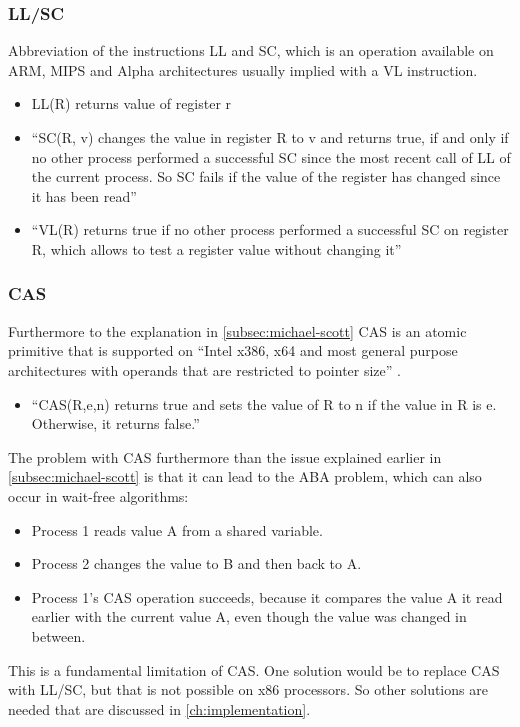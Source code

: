 \subsubsection{\acf{LL/SC}}\label{subsubsec:llsc}
Abbreviation of the instructions \ac{LL} and \ac{SC}, which is an operation available on ARM, MIPS and Alpha architectures usually implied with a \ac{VL} instruction.
\begin{itemize}
    \item \ac{LL}(R) returns value of register r
    \item \enquote{\ac{SC}(R, v) changes the value in register R to v and returns true, if and only if no other process performed a successful SC since the most recent call of LL of the current process. So SC fails if the value of the register has changed since it has been read} \cite{Fuchs2014EvaluationOT}
    \item \enquote{\ac{VL}(R) returns true if no other process performed a successful SC on register R, which allows to test a register value without changing it} \cite{Fuchs2014EvaluationOT}
\end{itemize}
\cite{Fuchs2014EvaluationOT}

\subsubsection{\acf{CAS}}\label{subsubsec:compare-and-swap}
Furthermore to the explanation in \cref{subsec:michael-scott} \ac{CAS} is an atomic primitive that is supported on \enquote{Intel x386, x64 and most general purpose architectures with operands that are restricted to pointer size} \cite{Fuchs2014EvaluationOT}.
\begin{itemize}
    \item \enquote{\ac{CAS}(R,e,n) returns true and sets the value of R to n if the value in R is e. Otherwise, it returns false.} \cite{Fuchs2014EvaluationOT}
\end{itemize}
The problem with \ac{CAS} furthermore than the issue explained earlier in \cref{subsec:michael-scott} is that it can lead to the ABA problem, which can also occur in wait-free algorithms:
\begin{itemize}
    \item Process 1 reads value A from a shared variable.
    \item Process 2 changes the value to B and then back to A.
    \item Process 1's \ac{CAS} operation succeeds, because it compares the value A it read earlier with the current value A, even though the value was changed in between.
\end{itemize}
This is a fundamental limitation of \ac{CAS}. One solution would be to replace \ac{CAS} with \ac{LL/SC}, but that is not possible on x86 processors. So other solutions are needed that are discussed in \cref{ch:implementation}. \cite{Fuchs2014EvaluationOT}

